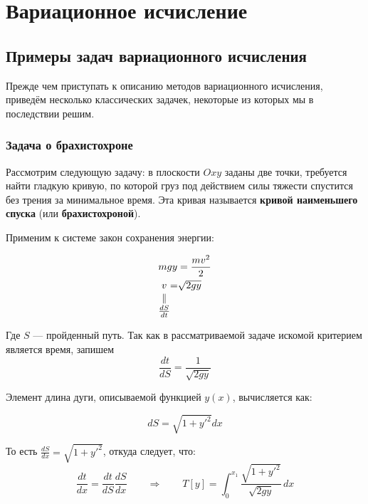 \documentclass[12pt]{article}
\begin{document}
\section{Вариационное исчисление}

	\subsection{Примеры задач вариационного исчисления}

	Прежде чем приступать к описанию методов вариационного исчисления, приведём несколько классических
	задачек, некоторые из которых мы в последствии решим.

		\subsubsection{Задача о брахистохроне}

			Рассмотрим следующую задачу: в плоскости $Oxy$ заданы две точки, требуется найти гладкую кривую, 
			по которой груз под действием силы тяжести спустится без трения за минимальное время. Эта кривая
			называется \textbf{кривой наименьшего спуска} (или \textbf{брахистохроной}).


			Применим к системе закон сохранения энергии:

			\begin{align*}
				&mgy = \frac{mv^2}{2} \\
				&\begin{CD}
					v @.=@. \sqrt{2gy} @.\\
					\vspace{-27pt}\\
					\parallel @. @. @. \\
					\vspace{-27pt}\\
					\frac{dS}{dt} @. @. @.
				\end{CD}
			\end{align*}

			Где $S$ --- пройденный путь. Так как в рассматриваемой задаче искомой критерием является время,
			запишем $$\frac{dt}{dS} = \frac{1}{\sqrt{2gy}}$$

			Элемент длина дуги, описываемой функцией $y(x)$, вычисляется как:

			$$dS = \sqrt{1 + y'^2} dx$$

			То есть $\frac{dS}{dx} = \sqrt{1 + y'^2}$, откуда следует, что:
			$$\frac{dt}{dx} = \frac{dt}{dS} \frac{dS}{dx} \qquad\Rightarrow\qquad 
				T[y] = \int_0^{x_1} \frac{\sqrt{1+y'^2}}{\sqrt{2gy}} \, dx$$
\end{document}
